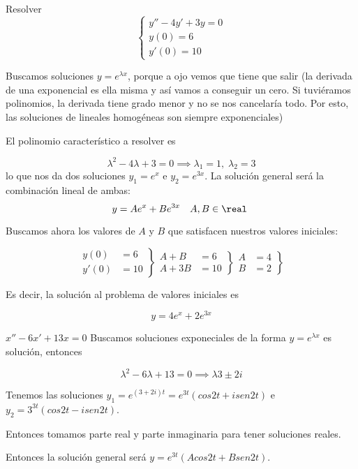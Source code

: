 \documentclass[nochap]{apuntes}
\begin{document}
\begin{problem}[4] Resolver \[ \begin{cases}y''-4y'+3y=0\\y(0)=6\\y'(0)=10\end{cases} \]

\solution

Buscamos soluciones $y=e^{\lambda x}$, porque a ojo vemos que tiene que salir (la derivada de una exponencial es ella misma y así vamos a conseguir un cero. Si tuviéramos polinomios, la derivada tiene grado menor y no se nos cancelaría todo. Por esto, las soluciones de lineales homogéneas son siempre exponenciales)

El polinomio característico a resolver es

\[
\lambda^2 - 4\lambda + 3 = 0 \implies \lambda_1 = 1,\;\lambda_2=3
\]
lo que nos da dos soluciones $y_1 = e^x$ e $y_2=e^{3x}$. La solución general será la combinación lineal de ambas: \[ y= Ae^x+Be^{3x}\quad A,B\in\real \]

Buscamos ahora los valores de $A$ y $B$ que satisfacen nuestros valores iniciales:

\[ 
\left.\begin{matrix}
y(0) &= 6 \\
y'(0) &= 10
\end{matrix}\right\}
\left.\begin{matrix}
A + B &= 6 \\
A + 3B &= 10
\end{matrix}\right\}
\left.\begin{matrix}
A &= 4\\
B &= 2
\end{matrix}\right\} \]

Es decir, la solución al problema de valores iniciales es 

\[ y = 4e^x + 2e^{3x} \]

\end{problem}
\begin{problem}[4'5]
$x''-6x'+13x=0$
\solution
Buscamos soluciones exponeciales de la forma $y=e^{\lambda x}$ es solución, entonces 

\[\lambda^2 - 6\lambda + 13 = 0 \implies \lambda3\pm2i\]

Tenemos las soluciones $y_1 = e^{(3+2i)t} = e^{3t}(cos2t+isen2t)$ e $y_2=3^{3t}(cos2t - isen2t)$.

Entonces tomamos parte real y parte inmaginaria para tener soluciones reales.

Entonces la solución general será $y=e^{3t}(Acos2t + Bsen2t)$.
\end{problem}
\end{document}
